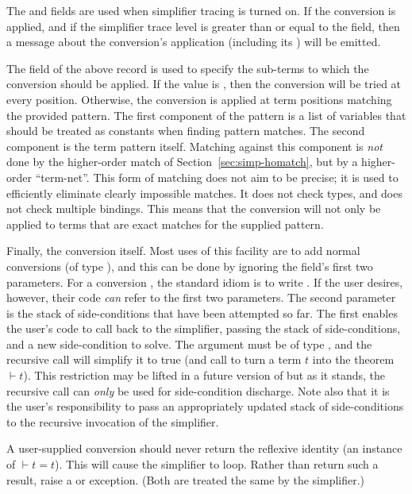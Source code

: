 {The  and  fields are used when simplifier tracing
is turned on.  If the conversion is applied, and if the simplifier
trace level is greater than or equal to the  field, then a
message about the conversion's application (including its )
will be emitted.

The  field of the above record is used to specify the
sub-terms to which the conversion should be applied.  If the value is
, then the conversion will be tried at every position.
Otherwise, the conversion is applied at term positions matching the
provided pattern.  The first component of the pattern is a list of
variables that should be treated as constants when finding pattern
matches.  The second component is the term pattern itself.  Matching
against this component is \emph{not} done by the higher-order match of
Section~\ref{sec:simp-homatch}, but by a higher-order ``term-net''.
This form of matching does not aim to be precise; it is used to
efficiently eliminate clearly impossible matches.  It does not check
types, and does not check multiple bindings.  This means that the
conversion will not only be applied to terms that are exact matches
for the supplied pattern.

Finally, the conversion itself.  Most uses of this facility are to add
normal \HOL{} conversions (of type ), and this can be
done by ignoring the  field's first two parameters.  For a
conversion , the standard idiom is to write
.  If the user desires, however, their code
\emph{can} refer to the first two parameters.  The second parameter is
the stack of side-conditions that have been attempted so far.  The
first enables the user's code to call back to the simplifier, passing
the stack of side-conditions, and a new side-condition to solve.  The
 argument must be of type , and the recursive
call will simplify it to true (and call  to turn a term
$t$ into the theorem $\vdash t$).  This restriction may be lifted in a
future version of \HOL{} but as it stands, the recursive call can
\emph{only} be used for side-condition discharge.  Note also that it
is the user's responsibility to pass an appropriately updated stack of
side-conditions to the recursive invocation of the simplifier.

A user-supplied conversion should never return the reflexive identity
(an instance of $\vdash t = t$).  This will cause the simplifier to
loop.  Rather than return such a result, raise a  or
 exception.  (Both are treated the same by the simplifier.)

}
